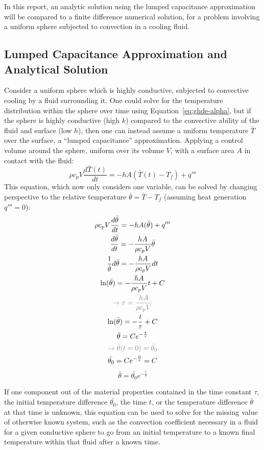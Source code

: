 \documentclass[12pt]{article}
\begin{document}
In this report, an analytic solution using the lumped capacitance approximation will be compared to a finite difference numerical solution, for a problem involving a uniform sphere subjected to convection in a cooling fluid.
\FloatBarrier\subsection{Lumped Capacitance Approximation and Analytical Solution}
Consider a uniform sphere which is highly conductive, subjected to convective cooling by a fluid surrounding it.
One could solve for the temperature distribution within the sphere over time using Equation~\ref{eq:ghde-alpha}, but if the sphere is highly conductive (high $k$) compared to the convective ability of the fluid and surface (low $h$), then one can instead assume a uniform temperature $\bar{T}$ over the surface, a ``lumped capacitance'' approximation.
Applying a control volume around the sphere, uniform over its volume $V$, with a surface area $A$ in contact with the fluid:
\begin{equation}\label{eq:lumped}
    \rho c_pV\frac{d\bar{T}(t)}{dt} = -hA(\bar{T}(t) - T_f) + q'''
\end{equation}
This equation, which now only considers one variable, can be solved by changing perspective to the relative temperature $\bar{\theta}=\bar{T} - T_f$ (assuming heat generation $q'''=0$):
\begin{gather*}
    \rho c_pV\frac{d\bar{\theta}}{dt} = -hA(\bar{\theta}) + q'''\\
    \frac{d\bar{\theta}}{dt}=-\frac{hA}{\rho c_p V}\bar{\theta}\\
    \frac{1}{\bar{\theta}}d\bar{\theta} = -\frac{hA}{\rho c_p V}dt\\
    \ln(\bar{\theta}) = -\frac{hA}{\rho c_p V}t + C\\
    \color{gray}\rightarrow \tau=\frac{hA}{\rho c_p V}\\
    \ln(\bar{\theta}) = -\frac{t}{\tau} + C\\
    \bar{\theta}=Ce^{-\frac{t}{\tau}}\\
    \color{gray}\rightarrow \bar{\theta}(t=0)=\bar{\theta_0}\\
    \bar{\theta_0}=Ce^{-\frac{0}{\tau}}=C
\end{gather*}
\begin{equation}
    \label{eq:anal}
    \bar{\theta}=\bar{\theta_0}e^{-\frac{t}{\tau}}
\end{equation}

If one component out of the material properties contained in the time constant $\tau$, the initial temperature difference $\bar{\theta_0}$, the time $t$, or the temperature difference $\bar{\theta}$ at that time is unknown, this equation can be used to solve for the missing value of otherwise known system, such as the convection coefficient necessary in a fluid for a given conductive sphere to go from an initial temperature to a known final temperature within that fluid after a known time.\\
\end{document}
